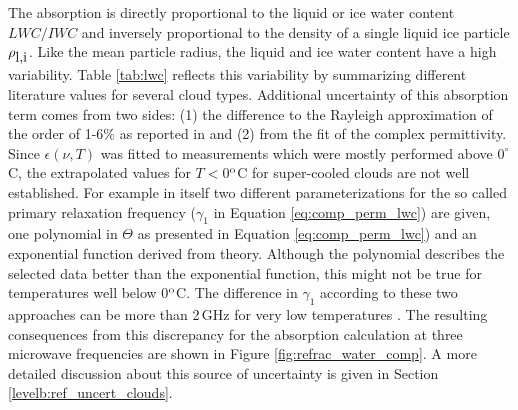 %
The absorption is directly proportional to the liquid or ice water
content $LWC/IWC$ and inversely proportional to the density of a
single liquid ice particle $\rho_{\mbox{\rm l,i}}$. Like the mean particle radius,
the liquid and ice water content have a high variability. Table
\ref{tab:lwc} reflects this variability by summarizing different
literature values for several cloud types. Additional uncertainty 
of this absorption term comes from two sides: 
(1) the difference to the Rayleigh approximation
of the order of 1-6\% as reported in \citet{lietal:97} and (2) from
the fit of the complex permittivity.  Since $\epsilon(\nu,T)$ was
fitted to measurements which were mostly performed above $0^\circ$C,
the extrapolated values for $T<$0$^{\rm o}$C for super-cooled
clouds are not well established. For example in \citet{liebeetal:91} 
itself two different parameterizations for the so called primary 
relaxation frequency ($\gamma_1$ in Equation \ref{eq:comp_perm_lwc}) 
are given, one polynomial in $\Theta$ as presented in 
Equation \ref{eq:comp_perm_lwc}) and an exponential function derived
from theory. Although the polynomial describes the selected 
data better than the exponential function, this might not be true for
temperatures well below 0$^{\rm o}$C.
The difference in $\gamma_1$ according to these two approaches can 
be more than 2\,GHz for very low temperatures \citep{liptonetal:99}. 
The resulting consequences from this discrepancy for the absorption 
calculation at three microwave frequencies are shown in 
Figure \ref{fig:refrac_water_comp}. A more detailed
discussion about this source of uncertainty is given in Section
\ref{levelb:ref_uncert_clouds}.
%
